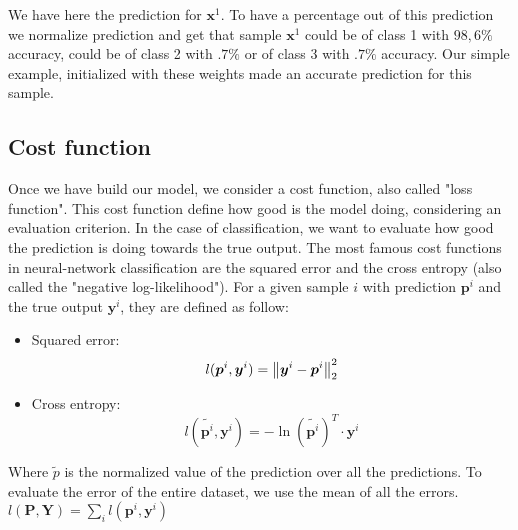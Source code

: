 		We have here the prediction for $\boldsymbol{x}^1$. To have a percentage out of this prediction we normalize prediction and get that sample $\boldsymbol{x}^1$ could be of class 1 with $98,6\%$ accuracy, could be of class 2 with $.7\%$ or of class 3 with $.7\%$ accuracy. Our simple example, initialized with these weights made an accurate prediction for this sample.
	

	\subsection{Cost function}
	\label{sec:cost_function}
		Once we have build our model, we consider a cost function, also called "loss function". This cost function define how good is the model doing, considering an evaluation criterion. In the case of classification, we want to evaluate how good the prediction is doing towards the true output.
		The most famous cost functions in neural-network classification are the squared error and the cross entropy (also called the "negative log-likelihood"). For a given sample $i$ with prediction $\boldsymbol{p}^i$ and the true output $\boldsymbol{y}^i$, they are defined as follow:
		\begin{itemize}
			\item Squared error: $$ l(\boldsymbol{p}^i,\boldsymbol{y}^i) = \left\lVert\boldsymbol{y}^i - \boldsymbol{p}^i\right\rVert_2^2 $$
			\item Cross entropy: $$ l(\widetilde{\boldsymbol{p}^i},\boldsymbol{y}^i) = -\ln(\widetilde{\boldsymbol{p}^i})^T\cdot{\boldsymbol{y}^i}  $$
		\end{itemize}
		Where $ \tilde{p} $ is the normalized value of the prediction over all the predictions. To evaluate the error of the entire dataset, we use the mean of all the errors. $l(\boldsymbol{P},\boldsymbol{Y}) = \sum_i l(\boldsymbol{p}^i,\boldsymbol{y}^i)$

